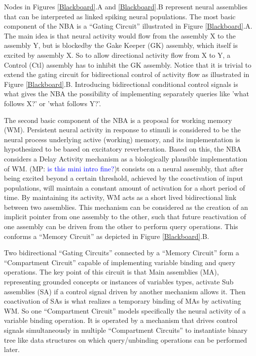 \documentclass[10pt]{article}
\newcommand{\notenewMdK}[2]{}
\newcommand{\notenewMP}[3]{(MP: \textcolor{blue}{#1})}
\begin{document}
Nodes in Figures {\ref{Blackboard}}.A and {\ref{Blackboard}}.B represent neural assemblies that can be interpreted as linked spiking neural populations.
The most basic component of the NBA is a ``Gating Circuit'' illustrated in Figure {\ref{Blackboard}}.A.
The main idea is that neural activity would flow from the assembly X to the assembly Y, but is blockedby the Gake Keeper (GK) assembly, 
which itself is excited by assembly X.
So to allow directional activity flow from X to Y, a Control (Ctl) assembly has to inhibit the GK assembly.
Notice that it is trivial to extend the gating circuit for bidirectional control of activity flow as illustrated in Figure {\ref{Blackboard}}.B.
Introducing bidirectional conditional control signals is what gives the NBA the possibility of implementing separately queries like 'what follows X?' or 'what follows Y?'.

The second basic component of the NBA is a proposal for working memory (WM).
Persistent neural activity in response to stimuli is considered to be the neural process underlying active (working) memory, and its implementation is hypothesized to be based on excitatory reverberation\cite{wang2001synaptic}.
Based on this, the NBA considers a Delay Activity\cite{de_Kamps_2005} mechanism as a biologically plausible implementation of WM. \notenewMdK{Consider Brunel and Wang.}.
\notenewMP{is this mini intro fine?}.
It consists on a neural assembly, that after being excited beyond a certain threshold, achieved by the coactivation of input populations, will maintain a constant amount of activation for a short period of time. By maintaining its activity, WM acts as a short lived bidirectional link between two assemblies. This mechanism can be considered as the creation of an implicit pointer from one assembly to the other, such that future reactivation of one assembly can be driven from the other to perform query operations. This conforms a ``Memory Circuit'' as depicted in Figure {\ref{Blackboard}}.B.

Two bidirectional ``Gating Circuits'' connected by a ``Memory Circuit'' form a ``Compartment Circuit'' capable of implementing variable binding and query operations.
The key point of this circuit is that Main assemblies (MA), representing grounded concepts or instances of variables types, activate Sub assemblies (SA) 
if a control signal driven by another mechanism allows it.
Then coactivation of SAs is what realizes a temporary binding of MAs by activating WM.
So one ``Compartment Circuit'' models specifically the neural activity of a variable binding operation.
It is operated by a mechanism that drives control signals simultaneously in multiple ``Compartment Circuits'' to instantiate binary tree like data structures on which query/unbinding operations can be performed later. 
\end{document}
